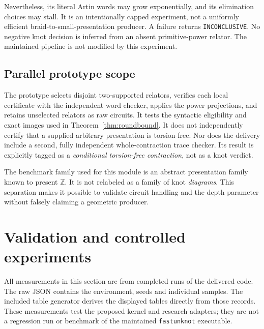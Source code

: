 \documentclass[11pt,letterpaper]{article}
\theoremstyle{definition}
\newcommand{\Z}{\mathbb Z}
\newcommand{\INC}{\texttt{INCONCLUSIVE}}
\begin{document}
Nevertheless, its literal Artin words may grow exponentially, and its
elimination choices may stall. It is an intentionally capped experiment,
not a uniformly efficient braid-to-small-presentation producer. A failure
returns \INC. No negative knot decision is inferred from an absent
primitive-power relator. The maintained pipeline is not modified by this
experiment.

\subsection{Parallel prototype scope}
The prototype selects disjoint two-supported relators, verifies each local
certificate with the independent word checker, applies the power projections,
and retains unselected relators as raw circuits. It tests the syntactic
eligibility and exact images used in Theorem~\ref{thm:roundbound}. It does
not independently certify that a supplied arbitrary presentation is
torsion-free. Nor does the delivery include a second, fully independent
whole-contraction trace checker. Its result is explicitly tagged as a
\emph{conditional torsion-free contraction}, not as a knot verdict.

The benchmark family used for this module is an abstract presentation
family known to present $\Z$. It is not relabeled as a family of knot
\emph{diagrams}. This separation makes it possible to validate circuit
handling and the depth parameter without falsely claiming a geometric
producer.

\section{Validation and controlled experiments}
\label{sec:experiments}
All measurements in this section are from completed runs of the delivered
code. The raw JSON contains the environment, seeds and individual samples. The included table generator derives the displayed
tables directly from those records. These measurements test the proposed
kernel and research adapters; they are not a regression run or benchmark
of the maintained \texttt{fastunknot} executable.
\end{document}
